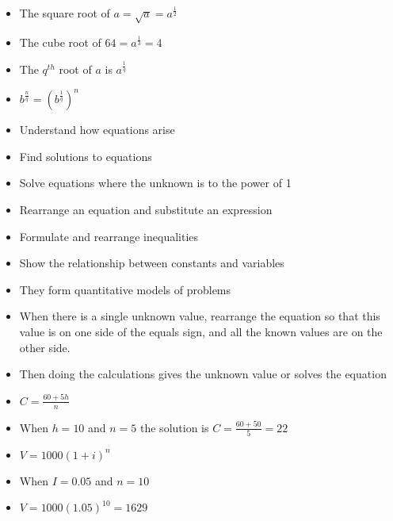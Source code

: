\begin{frame}
\begin{itemize}
	\item The square root of $a =  \sqrt{a}  =  a^{\frac{1}{2}}$
	\item The cube root of $64 =  a^{\frac{1}{3}} = 4$
	\item The $q^{th}$ root of $a$ is $a^{\frac{1}{q}}$
	\item $b^{\frac{n}{q}}= (b^{\frac{1}{q}})^n$
\end{itemize}
\end{frame}
\begin{frame}
\begin{itemize}
  \item Understand how equations arise
  \item Find solutions to equations
  \item Solve equations where the unknown is to the power of 1
  \item Rearrange an equation and substitute an expression
  \item Formulate and rearrange inequalities
\end{itemize}
\end{frame}
\begin{frame}
\begin{itemize}
\item Show the relationship between constants and variables
\item They form quantitative models of problems
\item When there is a single unknown value, rearrange the equation so that this value is on one side of the equals sign,
and all the known values are on the other side.
\item Then doing the calculations gives the unknown value or solves the equation
\end{itemize}
\end{frame}
\begin{frame}
\begin{itemize}
\item $ C = \frac{60+5h}{n} $
\item When $h = 10$ and $n = 5$ the solution is $C = \frac{60+50}{5} = 22$
\vspace*{.35cm}
\item $V = 1000(1+i)^n$
\item When $I = 0.05$ and $n = 10$
\item $V = 1000(1.05)^10  =  1629$
\end{itemize}
\end{frame}
